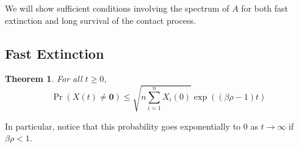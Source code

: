 \documentclass[11pt]{article}
\newtheorem{theorem}{Theorem}[section]
\begin{document}
We will show sufficient conditions involving the spectrum of $A$ for both fast extinction and long survival of the contact process.


\subsection{Fast Extinction}

\begin{theorem} \label{thm:fast_extinction}
For all $t\geq 0$,
$$\Pr(X(t)\neq \mathbf{0}) \leq \sqrt{n \sum_{i=1}^n X_i(0)} \exp((\beta \rho -1)t)$$
\end{theorem}

In particular, notice that this probability goes exponentially to 0 as $t \rightarrow \infty$ if $\beta \rho < 1$.

\end{document}
